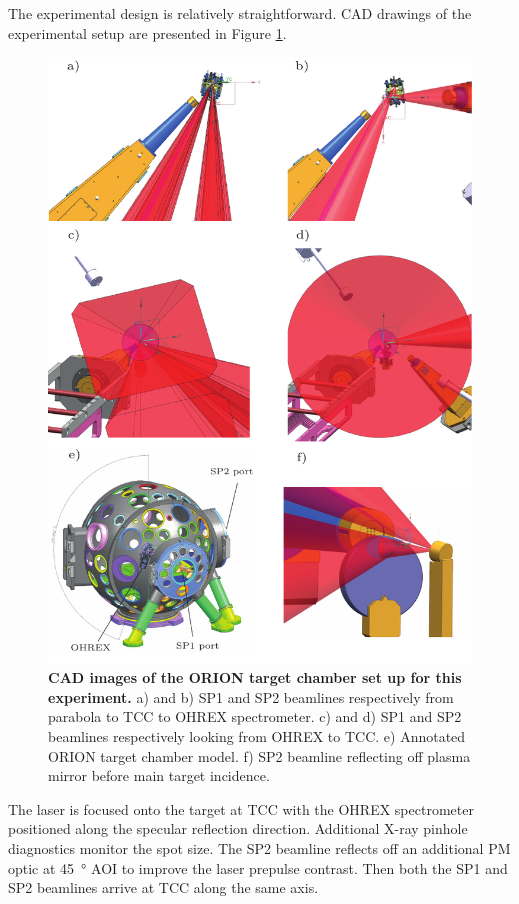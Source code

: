 The experimental design is relatively straightforward. CAD drawings of the experimental setup are presented in Figure \ref{fig:orioncad}.
\begin{figure}
	\centering
	\includegraphics[width=1\linewidth]{figures/orion/orion_cad}
	\caption[ORION HHG experiment target chamber set up.]{\textbf{CAD images of the ORION target chamber set up for this experiment.} a) and b) SP1 and SP2 beamlines respectively from parabola to TCC to OHREX spectrometer. c) and d) SP1 and SP2 beamlines respectively looking from OHREX to TCC. e) Annotated ORION target chamber model. f) SP2 beamline reflecting off plasma mirror before main target incidence.}
	\label{fig:orioncad}
\end{figure}
The laser is focused onto the target at \ac{TCC} with the \ac{OHREX} spectrometer positioned along the specular reflection direction. Additional X-ray pinhole diagnostics monitor the spot size. The SP2 beamline reflects off an additional \ac{PM} optic at \qty{45}{\degree} \ac{AOI} to improve the laser prepulse contrast. Then both the SP1 and SP2 beamlines arrive at \ac{TCC} along the same axis.

